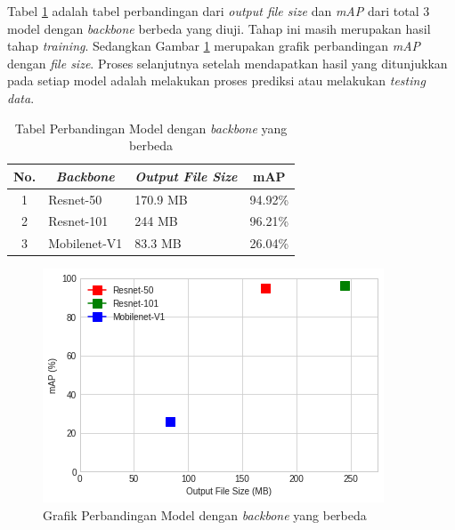 Tabel \ref{tab:train-recap} adalah tabel perbandingan dari \textit{output file size} dan \textit{mAP} dari total 3 model dengan \textit{backbone} berbeda yang diuji. Tahap ini masih merupakan hasil tahap \textit{training}. Sedangkan Gambar \ref{fig:graph-recap} merupakan grafik perbandingan \textit{mAP} dengan \textit{file size}. Proses selanjutnya setelah mendapatkan hasil yang ditunjukkan pada setiap model adalah melakukan proses prediksi atau melakukan \textit{testing data}.

\begin{table}[H]
	\centering
	\caption{Tabel Perbandingan Model dengan \textit{backbone} yang berbeda}
	\begin{tabular}{|c|l|l|l|}
		\hline
		\textbf{No.} & \multicolumn{1}{c|}{\textit{\textbf{Backbone}}} & \multicolumn{1}{c|}{\textit{\textbf{Output File Size}}} & \multicolumn{1}{c|}{\textbf{mAP}} \\ \hline
		1            & Resnet-50                                       & 170.9 MB                                                & 94.92\%                           \\ \hline
		2            & Resnet-101                                      & 244 MB                                                  & 96.21\%                           \\ \hline
		3            & Mobilenet-V1                                    & 83.3 MB                                                 & 26.04\%                           \\ \hline
	\end{tabular}
	\label{tab:train-recap}
\end{table}

\newpage

\begin{figure}[H]
	\centering
	\includegraphics[scale=0.75]{gambar/graph-recap.png}
	\caption{Grafik Perbandingan Model dengan \textit{backbone} yang berbeda}
	\label{fig:graph-recap}
\end{figure}

